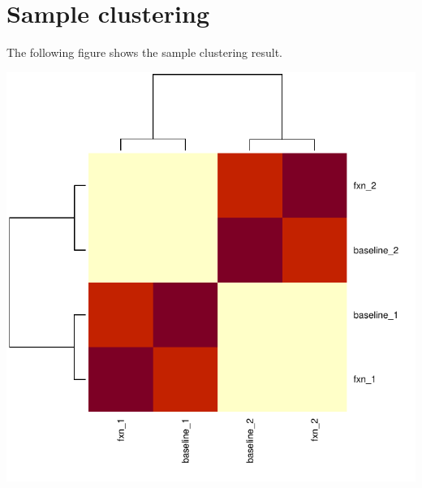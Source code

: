 \documentclass{article}
\begin{document}
\newpage\section{Sample clustering}
The following figure shows the sample clustering result.


\includegraphics{count_20200409__countsummary-009}

\end{document}
